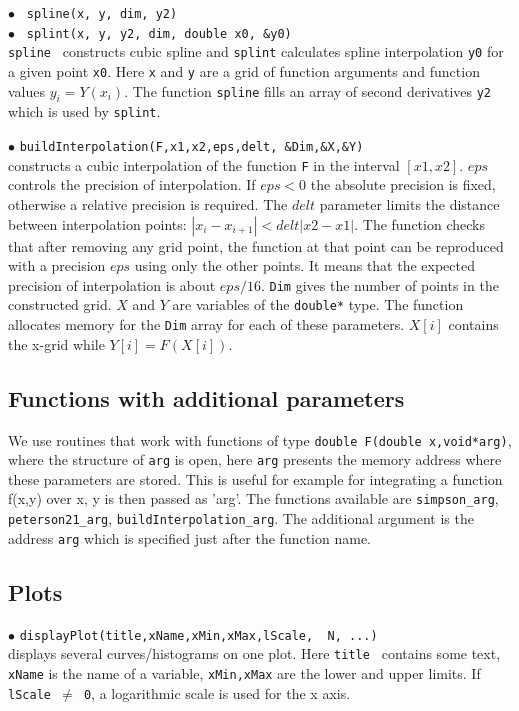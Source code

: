 \documentclass[12pt,a4paper]{article}
\begin{document}
\noindent$\bullet$ \verb| spline(x, y, dim, y2)|\\
\noindent$\bullet$ \verb| splint(x, y, y2, dim, double x0, &y0)|\\
{\tt spline } constructs cubic  spline and {\tt splint} calculates spline
interpolation \verb|y0|  for a given point \verb|x0|. Here  {\tt x} and {\tt y} are a 
grid of function arguments and function values $y_i= Y(x_i)$. The 
function {\tt spline} fills   an array of second  derivatives {\tt y2} which is 
used by  {\tt splint}.
   

\noindent$\bullet$ \verb|buildInterpolation(F,x1,x2,eps,delt, &Dim,&X,&Y)|\\
constructs  a cubic interpolation of the function \verb|F| in the interval $[x1,x2]$.
$eps$ controls the precision of interpolation. If $eps < 0$ the absolute 
precision is fixed, otherwise a relative precision is required.
The $delt$ parameter limits the  distance between  interpolation points: $|x_i
-x_{i+1}|<delt|x2-x1|$.  
The function checks that after removing any grid point, the function at that point
can be reproduced with a precision $eps$ using only the other points.  It means that
the expected precision of interpolation is about $eps/16$. \verb|Dim| gives the number 
of points in the  constructed grid. $X$ and $Y$ are variables of the  
\verb|double*| type. The function allocates memory for the  \verb|Dim| array for each 
 of these parameters. $X[i]$ contains the x-grid while $Y[i]=F(X[i])$.

\subsection{Functions with additional parameters}

We use routines that work with functions of type \verb|double F(double x,void*arg)|,  where the structure of \verb|arg| is open, here  {\tt arg} presents the  memory address where these parameters are stored.  This is useful for example for integrating a function f(x,y) over x, y is then passed as 'arg'.
The functions available are \verb|simpson_arg|,  \verb|peterson21_arg|,  \verb|buildInterpolation_arg|. The additional
argument is the address {\tt arg} which is  specified just after the function name.


\subsection{Plots}
\noindent$\bullet$ \verb|displayPlot(title,xName,xMin,xMax,lScale,  N, ...)|\\
displays several  curves/histograms on one plot.  Here {\tt title  } contains some text, {\tt xName} is the name of a variable, 
{\tt xMin,xMax} are the lower and upper limits. If {\tt lScale $\neq$ 0}, a logarithmic scale 
is used for the x axis.
\end{document}
